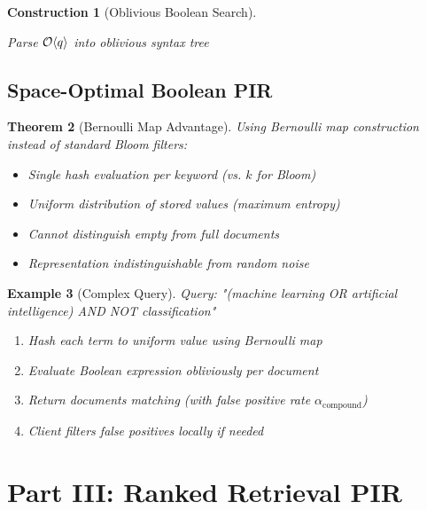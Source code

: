 \documentclass[11pt,final,hidelinks]{article}
\newtheorem{theorem}{Theorem}[section]
\newtheorem{example}[theorem]{Example}
\newtheorem{construction}[theorem]{Construction}
\begin{document}
\begin{construction}[Oblivious Boolean Search]
\begin{algorithm}[H]
\caption{Private Boolean Query Evaluation}
Parse $\mathcal{O}\langle q \rangle$ into oblivious syntax tree\;
\end{algorithm}
\end{construction}

\subsection{Space-Optimal Boolean PIR}

\begin{theorem}[Bernoulli Map Advantage]
Using Bernoulli map construction instead of standard Bloom filters:
\begin{itemize}
    \item Single hash evaluation per keyword (vs. $k$ for Bloom)
    \item Uniform distribution of stored values (maximum entropy)
    \item Cannot distinguish empty from full documents
    \item Representation indistinguishable from random noise
\end{itemize}
\end{theorem}

\begin{example}[Complex Query]
Query: "(machine learning OR artificial intelligence) AND NOT classification"
\begin{enumerate}
    \item Hash each term to uniform value using Bernoulli map
    \item Evaluate Boolean expression obliviously per document
    \item Return documents matching (with false positive rate $\alpha_{\text{compound}}$)
    \item Client filters false positives locally if needed
\end{enumerate}
\end{example}

\section{Part III: Ranked Retrieval PIR}
\end{document}
